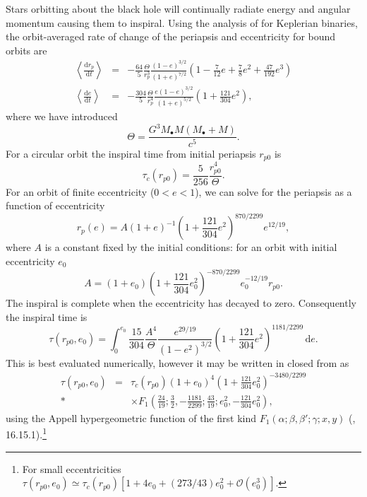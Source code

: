 \documentclass[useAMS,usedcolumn,usegraphicx,usenatbib]{mn2e}
\newcommand{\dd}{\ensuremath{\mathrm{d}}}
\newcommand{\diff}[2]{\ensuremath{\frac{\dd {#1}}{\dd {#2}}}}
\newcommand{\intd}[4]{\ensuremath{\int_{#1}^{#2}{#3}\,\dd{#4}}}
\newcommand{\order}[1]{\ensuremath{\mathcal{O}({#1})}}
\begin{document}
Stars orbitting about the black hole will continually radiate energy and angular momentum causing them to inspiral. Using the analysis of \citet{Peters1964} for Keplerian binaries, the orbit-averaged rate of change of the periapsis and eccentricity for bound orbits are
\begin{eqnarray}
\left\langle\diff{r_p}{t}\right\rangle &=& -\frac{64}{5}\frac{\Theta}{r_p^3}\frac{(1 - e)^{3/2}}{(1 + e)^{7/2}}\left(1 - \frac{7}{12}e + \frac{7}{8}e^2 + \frac{47}{192}e^3\right) \\
\left\langle\diff{e}{t}\right\rangle &=& -\frac{304}{5}\frac{\Theta}{r_p^4}\frac{e(1 - e)^{3/2}}{(1 + e)^{5/2}}\left(1 + \frac{121}{304}e^2\right),
\end{eqnarray}
where we have introduced
\begin{equation}
\Theta = \frac{G^3M_\bullet M(M_\bullet + M)}{c^5}.
\end{equation}
For a circular orbit the inspiral time from initial periapsis $r_{p0}$ is
\begin{equation}
\tau_c(r_{p0}) = \frac{5}{256}\frac{r_{p0}^4}{\Theta}.
\end{equation}
For an orbit of finite eccentricity ($0 < e < 1$), we can solve for the periapsis as a function of eccentricity
\begin{equation}
r_p(e) = A(1 + e)^{-1}\left(1 + \frac{121}{304}e^2\right)^{870/2299}e^{12/19},
\end{equation}
where $A$ is a constant fixed by the initial conditions: for an orbit with initial eccentricity $e_0$
\begin{equation}
A = (1 + e_0)\left(1 + \frac{121}{304}e_0^2\right)^{-870/2299}e_0^{-12/19}r_{p0}.
\end{equation}
The inspiral is complete when the eccentricity has decayed to zero. Consequently the inspiral time is~\citep{Peters1964}
\begin{equation}
\tau(r_{p0},e_0) = \intd{0}{e_0}{\frac{15}{304}\frac{A^4}{\Theta}\frac{e^{29/19}}{(1-e^2)^{3/2}}\left(1 + \frac{121}{304}e^2\right)^{1181/2299}}{e}.
\end{equation}
This is best evaluated numerically, however it may be written in closed from as
\begin{eqnarray}
\tau(r_{p0},e_0) &=& \tau_c(r_{p0})(1 + e_0)^4\left(1 + \frac{121}{304}e_0^2\right)^{-3480/2299} \nonumber\\*
 & & \times F_1\left(\frac{24}{19};\frac{3}{2},-\frac{1181}{2299};\frac{43}{19};e_0^2,-\frac{121}{304}e_0^2\right),
\end{eqnarray}
using the Appell hypergeometric function of the first kind $F_1(\alpha;\beta,\beta';\gamma;x,y)$ (\citealt{Olver2010}, 16.15.1).\footnote{For small eccentricities $\tau(r_{p0},e_0) \simeq \tau_c(r_{p0})[1 + 4e_0 + (273/43)e_0^2 + \order{e_0^3}]$.}
\end{document}
